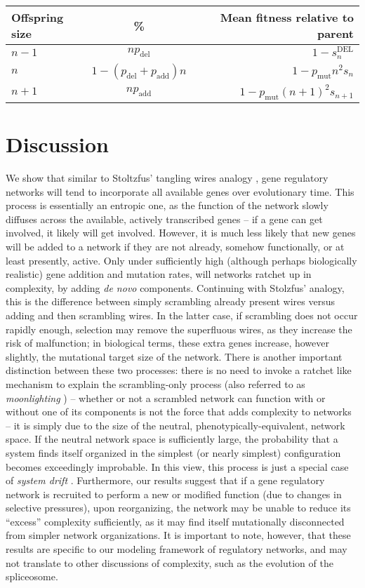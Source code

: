 \documentclass{article}
\newcommand{\1}{\mathbbm{1}}
\begin{document}
\begin{tabular}{l | c | r}
\hline
Offspring size & \% & Mean fitness relative to parent \\
\hline
$n-1$ & $n p_{\text{del}}$ & $1 - s^{\text{DEL}}_{n}$ \\
\hline
$n$ & $1 - (p_{\text{del}} + p_{\text{add}})n$ & $1 - p_{\text{mut}} n^2 s_n$ \\
\hline
$n+1$ & $n p_{\text{add}}$ & $1 - p_{\text{mut}}(n + 1)^2 s_{n+1}$ \\ 
\hline
\end{tabular}


\section{Discussion}

We show that similar to Stoltzfus' tangling wires analogy \citep{stoltzfus2012constructive},
gene regulatory networks will tend to incorporate all available genes over evolutionary time.
This process is essentially an entropic one, as the function of the network slowly diffuses
across the available, actively transcribed genes -- if a gene can get involved, it likely will get involved.
However, it is much less likely that new genes
will be added to a network if they are not already, somehow functionally, or at least presently, active.
Only under sufficiently high (although perhaps biologically realistic) gene addition and mutation rates,
will networks ratchet up in complexity,
by adding \emph{de novo} components. Continuing with Stolzfus' analogy, this is the difference between
simply scrambling already present wires versus adding and then scrambling wires. In the latter case,
if scrambling does not occur rapidly enough, selection may remove the superfluous wires, as they increase
the risk of malfunction; in biological terms, these extra genes increase,
however slightly, the mutational target size of the network.
There is another important distinction between these two processes: there is no need to invoke a ratchet like mechanism
to explain the scrambling-only process (also referred to as \emph{moonlighting} \citep{speijer2011does}) -- whether or
not a scrambled network can function with or without one of its components
is not the force that adds complexity to networks -- it is simply due to the size of the neutral, phenotypically-equivalent,
network space. If the neutral network space is sufficiently large, the probability that a system finds itself organized in the
simplest (or nearly simplest) configuration becomes exceedingly improbable.
In this view, this process is just a special case of \emph{system drift} \citep{true2001developmental, schiffman2018system}.
Furthermore, our results suggest that if a gene regulatory network is recruited to perform
a new or modified function (due to changes in selective pressures), upon reorganizing, the network may
be unable to reduce its ``excess'' complexity sufficiently, as it may find itself mutationally disconnected from
simpler network organizations. It is important to note, however, that these results are specific to our modeling
framework of regulatory networks, and may not translate to other discussions of complexity, such as the evolution of the spliceosome. 



\end{document}
